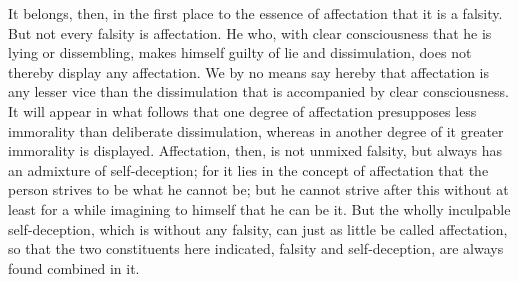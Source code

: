 \documentclass[12pt,a4paper,openany]{book}
\begin{document}
It belongs, then, in the first place to the essence of affectation that it is a
falsity. But not every falsity is affectation. He who, with clear consciousness that
he is lying or dissembling, makes himself guilty of lie and dissimulation, does not
thereby display any affectation. We by no means say hereby that affectation is any
lesser vice than the dissimulation that is accompanied by clear consciousness. It
will appear in what follows that one degree of affectation presupposes less
immorality than deliberate dissimulation, whereas in another degree of it greater
immorality is displayed. Affectation, then, is not unmixed falsity, but always has an
admixture of self-deception; for it lies in the concept of affectation that the
person strives to be what he cannot be; but he cannot strive after this without at
least for a while imagining to himself that he can be it. But the wholly inculpable
self-deception, which is without any falsity, can just as little be called
affectation, so that the two constituents here indicated, falsity and self-deception,
are always found combined in it.
\end{document}
